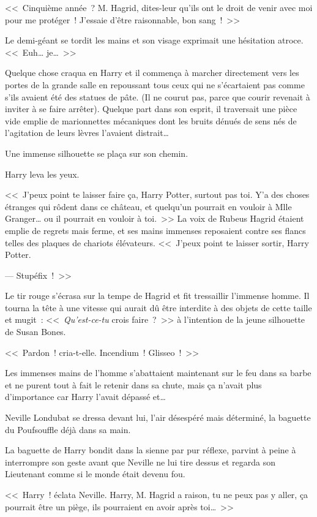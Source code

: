 <<~Cinquième année~? M. Hagrid, dites-leur qu'ils ont le droit de venir avec moi pour me protéger~! J'essaie d'être raisonnable, bon sang~!~>>

Le demi-géant se tordit les mains et son visage exprimait une hésitation atroce. <<~Euh… je…~>>

Quelque chose craqua en Harry et il commença à marcher directement vers les portes de la grande salle en repoussant tous ceux qui ne s'écartaient pas comme s'ils avaient été des statues de pâte. (Il ne courut pas, parce que courir revenait à inviter à se faire arrêter). Quelque part dans son esprit, il traversait une pièce vide emplie de marionnettes mécaniques dont les bruits dénués de sens nés de l'agitation de leurs lèvres l'avaient distrait…

Une immense silhouette se plaça sur son chemin.

Harry leva les yeux.

<<~J'peux point te laisser faire ça, Harry Potter, surtout pas toi. Y'a des choses étranges qui rôdent dans ce château, et quelqu'un pourrait en vouloir à Mlle Granger… ou il pourrait en vouloir à toi.~>> La voix de Rubeus Hagrid étaient emplie de regrets mais ferme, et ses mains immenses reposaient contre ses flancs telles des plaques de chariots élévateurs. <<~J'peux point te laisser sortir, Harry Potter.

--- Stupéfix~!~>>

Le tir rouge s'écrasa sur la tempe de Hagrid et fit tressaillir l'immense homme. Il tourna la tête à une vitesse qui aurait dû être interdite à des objets de cette taille et mugit~: <<~\emph{Qu'est-ce-tu} crois faire~?~>> à l'intention de la jeune silhouette de Susan Bones.

<<~Pardon~! cria-t-elle. Incendium~! Glisseo~!~>>

Les immenses mains de l'homme s'abattaient maintenant sur le feu dans sa barbe et ne purent tout à fait le retenir dans sa chute, mais ça n'avait plus d'importance car Harry l'avait dépassé et…

Neville Londubat se dressa devant lui, l'air désespéré mais déterminé, la baguette du Poufsouffle déjà dans sa main.

La baguette de Harry bondit dans la sienne par pur réflexe, parvint à peine à interrompre son geste avant que Neville ne lui tire dessus et regarda son Lieutenant comme si le monde était devenu fou.

<<~Harry~! éclata Neville. Harry, M. Hagrid a raison, tu ne peux pas y aller, ça pourrait être un piège, ils pourraient en avoir après toi…~>>


